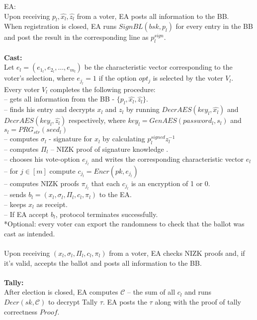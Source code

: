  EA:\\
Upon receiving $p_l,\hat{x_l},\hat{z_l}$ from a voter, EA posts all information to the BB.\\
When registration is closed, EA runs  $SignBL(bsk, p_l)$ for every entry in the BB and post the result in the corresponding line as $p^{sign}_l$.\\\\
\textbf{Cast:}\\
Let $e_l = (e_{1_l},e_{2_l},\dots,e_{m_l})$ be the characteristic vector corresponding to the voter's selection, where $e_{j_l}=1$ if the option $opt_j$ is selected by the voter $V_l$.\\ 
Every voter $V_l$ completes the following procedure:\\
-- gets all information from the BB - $\{p_l,\hat{x_l},\hat{z_l}\}$.\\
-- finds his entry and decrypts $x_l$ and $z_l$ by running $DecrAES(key_l,\hat{x_l})$ and $DecrAES(key_l,\hat{z_l})$ respectively, where $key_l =  GenAES(password_l, s_l)$ and  $s_l = PRG_{str}(seed_l)$\\
-- computes  $\sigma_l$ - signature for $x_l$  by calculating  $p^{signed}_lz_l^{-1}$\\
-- computes $\Pi_l$ -- NIZK proof of signature knowledge .\\
-- chooses his vote-option $e_{j_l}$ and writes the corresponding characteristic vector $e_l$\\
-- for $j \in [m]$ compute $c_{j_l} =  Encr(pk,e_{j_l})$\\
-- computes NIZK proofs $\pi_{j_l}$ that each $c_{j_l}$ is an encryption of 1 or 0.\\
-- sends $b_l = (x_l, \sigma_l, \Pi_l, c_l, \pi_l)$ to the EA.\\
-- keeps $x_l$ as receipt.\\
-- If EA accept $b_l$, protocol terminates successfully.\\ 
*Optional: every voter can export the randomness to check that the ballot was cast as intended.\\\\
Upon receiving $(x_l, \sigma_l, \Pi_l, c_l, \pi_l)$ from a voter, EA checks NIZK proofs and, if it's valid, accepts the ballot and posts all information to the BB.\\\\
\textbf{Tally: }\\
After election is closed, EA computes $\mathcal{C}$ -- the sum of all $c_l$ and runs $Decr(sk, \mathcal{C})$ to decrypt Tally $\tau$. EA posts the $\tau$ along with the proof of tally correctness $Proof$.\\\\
